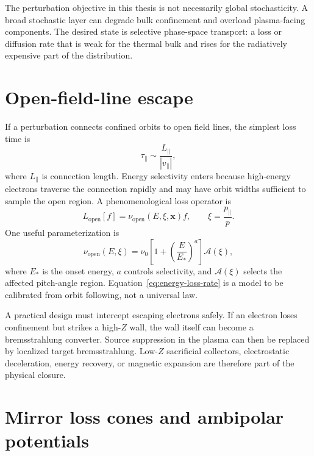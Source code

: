 The perturbation objective in this thesis is not necessarily global stochasticity. A broad stochastic layer can degrade bulk confinement and overload plasma-facing components. The desired state is selective phase-space transport: a loss or diffusion rate that is weak for the thermal bulk and rises for the radiatively expensive part of the distribution.

\section{Open-field-line escape}

If a perturbation connects confined orbits to open field lines, the simplest loss time is
\begin{equation}
\tau_{\parallel}\sim\frac{L_{\parallel}}{|v_{\parallel}|},
\label{eq:parallel-loss}
\end{equation}
where $L_{\parallel}$ is connection length. Energy selectivity enters because high-energy electrons traverse the connection rapidly and may have orbit widths sufficient to sample the open region. A phenomenological loss operator is
\begin{equation}
L_{\mathrm{open}}[f]
=\nu_{\mathrm{open}}(E,\xi,\mathbf{x})f,
\qquad \xi=\frac{p_\parallel}{p}.
\label{eq:open-operator}
\end{equation}
One useful parameterization is
\begin{equation}
\nu_{\mathrm{open}}(E,\xi)=
\nu_0\left[1+\left(\frac{E}{E_*}\right)^a\right]
\mathcal{A}(\xi),
\label{eq:energy-loss-rate}
\end{equation}
where $E_*$ is the onset energy, $a$ controls selectivity, and $\mathcal{A}(\xi)$ selects the affected pitch-angle region. Equation~\eqref{eq:energy-loss-rate} is a model to be calibrated from orbit following, not a universal law.

A practical design must intercept escaping electrons safely. If an electron loses confinement but strikes a high-$Z$ wall, the wall itself can become a bremsstrahlung converter. Source suppression in the plasma can then be replaced by localized target bremsstrahlung. Low-$Z$ sacrificial collectors, electrostatic deceleration, energy recovery, or magnetic expansion are therefore part of the physical closure.

\section{Mirror loss cones and ambipolar potentials}

